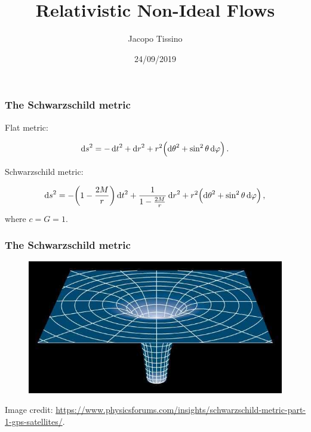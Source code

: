 \documentclass{beamer}
\title{Relativistic Non-Ideal Flows}
\author{Jacopo Tissino}
\date{24/09/2019}
\begin{document}
\frame{\titlepage}

\begin{frame}
    \frametitle{The Schwarzschild metric}
    Flat metric:

    \begin{equation*}
        \dd{s}^2 = -\dd{t}^2 + \dd{r}^2 + r^2 \qty(\dd{\theta}^2 + \sin^2\theta \dd{\varphi})\,.
    \end{equation*}

    Schwarzschild metric:

    \begin{equation*}
        \dd{s}^2 = -\qty(1-\frac{2M}{r})\dd{t}^2 + \frac{1}{1-\frac{2M}{r}} \dd{r}^2
        + r^2 \qty(\dd{\theta}^2 + \sin^2\theta \dd{\varphi})\,,
    \end{equation*}
    where \(c = G = 1\).


\end{frame}

\begin{frame}
    \frametitle{The Schwarzschild metric}
    \begin{figure}
        \includegraphics[width=\textwidth]{figures/Schwarzschild-Space}
    \end{figure}

    {\tiny Image credit: \url{https://www.physicsforums.com/insights/schwarzschild-metric-part-1-gps-satellites/}.}

\end{frame}
\end{document}

